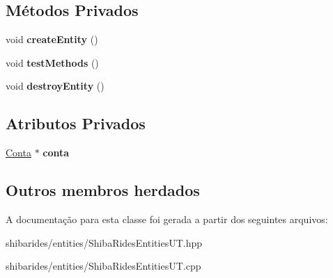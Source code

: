 \subsection*{Métodos Privados}
\begin{DoxyCompactItemize}
\item 
void {\bfseries create\+Entity} ()\hypertarget{classshibarides_1_1TUConta_a46245886d37c130c2b9e6b376769d649}{}\label{classshibarides_1_1TUConta_a46245886d37c130c2b9e6b376769d649}

\item 
void {\bfseries test\+Methods} ()\hypertarget{classshibarides_1_1TUConta_a14dfcdae5cf8c0c77476f6e947d1043c}{}\label{classshibarides_1_1TUConta_a14dfcdae5cf8c0c77476f6e947d1043c}

\item 
void {\bfseries destroy\+Entity} ()\hypertarget{classshibarides_1_1TUConta_adf20042c05b45a52c40cba582a27918c}{}\label{classshibarides_1_1TUConta_adf20042c05b45a52c40cba582a27918c}

\end{DoxyCompactItemize}
\subsection*{Atributos Privados}
\begin{DoxyCompactItemize}
\item 
\hyperlink{classshibarides_1_1Conta}{Conta} $\ast$ {\bfseries conta}\hypertarget{classshibarides_1_1TUConta_a9f6f3fce6eae9a97c60b1726f99daad6}{}\label{classshibarides_1_1TUConta_a9f6f3fce6eae9a97c60b1726f99daad6}

\end{DoxyCompactItemize}
\subsection*{Outros membros herdados}


A documentação para esta classe foi gerada a partir dos seguintes arquivos\+:\begin{DoxyCompactItemize}
\item 
shibarides/entities/Shiba\+Rides\+Entities\+U\+T.\+hpp\item 
shibarides/entities/Shiba\+Rides\+Entities\+U\+T.\+cpp\end{DoxyCompactItemize}
